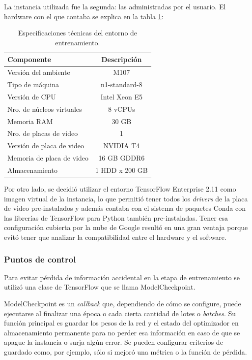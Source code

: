 La instancia utilizada fue la segunda: las administradas por el usuario. El hardware con el que contaba se explica en la tabla \ref{tab:vertex}:
\begin{table}[h]
	\centering
	\caption[Especificaciones técnicas Vertex]{Especificaciones técnicas del entorno de entrenamiento.}
	\begin{tabular}{l c}    
		\toprule
		\textbf{Componente}			& 			\textbf{Descripción}  \\
		\midrule	
		Versión del ambiente		& 			M107  \\
		Tipo de máquina 			& 			n1-standard-8  \\
		Versión de CPU				&			Intel Xeon E5 \\
		Nro. de núcleos virtuales 	& 			8 vCPUs \\
		Memoria RAM 				& 			30 GB  \\
		Nro. de placas de video 	& 			1  \\
		Versión de placa de video 	& 			NVIDIA T4 \\
		Memoria de placa de video	& 			16 GB GDDR6  \\
		Almacenamiento				&			1 HDD x 200 GB \\
		\bottomrule
		\hline
	\end{tabular}
	\label{tab:vertex}
\end{table}

Por otro lado, se decidió utilizar el entorno TensorFlow Enterprise 2.11 como imagen virtual de la instancia, lo que permitió tener todos los \textit{drivers} de la placa de video pre-instalados y además contaba con el sistema de paquetes Conda con las librerías de TensorFlow para Python también pre-instaladas. Tener esa configuración cubierta por la nube de Google resultó en una gran ventaja porque evitó tener que analizar la compatibilidad entre el hardware y el software.

\subsubsection{Puntos de control}

Para evitar pérdida de información accidental en la etapa de entrenamiento se utilizó una clase de TensorFlow que se llama ModelCheckpoint.

ModelCheckpoint es un \textit{callback} que, dependiendo de cómo se configure, puede ejecutarse al finalizar una época o cada cierta cantidad de lotes o \textit{batches}. Su función principal es guardar los pesos de la red y el estado del optimizador en almacenamiento permanente para no perder esa información en caso de que se apague la instancia o surja algún error. Se pueden configurar criterios de guardado como, por ejemplo, sólo si mejoró una métrica o la función de pérdida.

